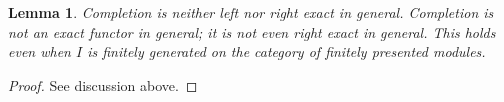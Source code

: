 \documentclass[10pt,a4paper]{amsart}
\newenvironment{slogan}{\comment}{\endcomment}
\theoremstyle{plain}
\newtheorem{lemma}[subsection]{Lemma}
\theoremstyle{definition}
\theoremstyle{remark}
\numberwithin{equation}{subsection}
\begin{document}
\begin{lemma}
\label{lemma-completion-not-exact}
\begin{slogan}
Completion is neither left nor right exact in general.
\end{slogan}
Completion is not an exact functor in general; it is not even
right exact in general. This holds even when $I$ is finitely
generated on the category of finitely presented modules.
\end{lemma}

\begin{proof}
See discussion above.
\end{proof}
\end{document}
